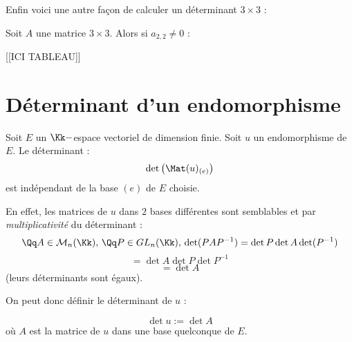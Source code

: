 \documentclass[class=report,crop=false]{standalone}
\newcommand{\GL}{GL}
\begin{document}
Enfin voici une autre fa\c{c}on de calculer un déterminant $3 \times 3$ :

\begin{exercicecours}
Soit $A$ une matrice $3 \times 3$. Alors si $a_{2,2} \neq 0$ :

[[ICI TABLEAU]]


\end{exercicecours}

\section{Déterminant d'un endomorphisme}

Soit $E$ un $\Kk-$espace vectoriel de dimension finie. Soit $u$ un endomorphisme de $E$. Le déterminant :
\[\det \left(\Mat(u)_{(e)}\right)\]
est indépendant de la base $(e)$ de $E$ choisie. 

En effet, les matrices de $u$ dans $2$ bases différentes sont semblables et par {\it multiplicativité} du déterminant :
\[\Qq A \in \mathcal{M}_n(\Kk),\, \Qq P \in \GL_n(\Kk),\, \det (P AP^{-1}) = \det P \det A \det (P^{-1}) \]\[= \det A \det P \det P^{-1}\]\[ = \det A \]
(leurs déterminants sont égaux).

On peut donc définir le déterminant de $u $ :
\begin{definition}
\[\det u := \det A\]
 où $A$ est la matrice de $u$ dans une base quelconque de $E$.
\end{definition}
\end{document}
